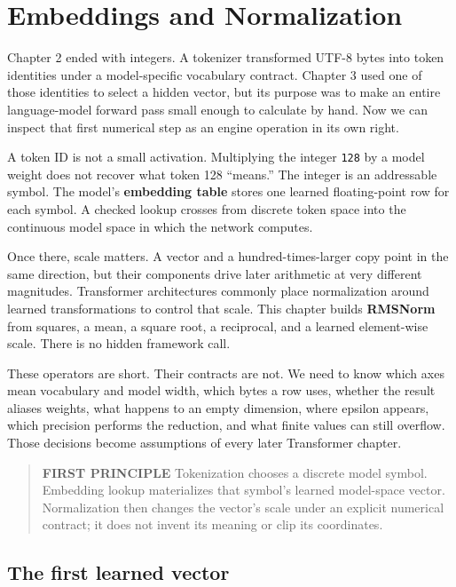 \chapter{Embeddings and Normalization}\label{chapter-7-embeddings-and-normalization}
Chapter 2 ended with integers. A tokenizer transformed UTF-8 bytes into
token identities under a model-specific vocabulary contract. Chapter 3
used one of those identities to select a hidden vector, but its purpose
was to make an entire language-model forward pass small enough to
calculate by hand. Now we can inspect that first numerical step as an
engine operation in its own right.

A token ID is not a small activation. Multiplying the integer
\texttt{128} by a model weight does not recover what token 128
``means.'' The integer is an addressable symbol. The model's
\textbf{embedding table} stores one learned floating-point row for each
symbol. A checked lookup crosses from discrete token space into the
continuous model space in which the network computes.

Once there, scale matters. A vector and a hundred-times-larger copy
point in the same direction, but their components drive later arithmetic
at very different magnitudes. Transformer architectures commonly place
normalization around learned transformations to control that scale. This
chapter builds \textbf{RMSNorm} from squares, a mean, a square root, a
reciprocal, and a learned element-wise scale. There is no hidden
framework call.

These operators are short. Their contracts are not. We need to know
which axes mean vocabulary and model width, which bytes a row uses,
whether the result aliases weights, what happens to an empty dimension,
where epsilon appears, which precision performs the reduction, and what
finite values can still overflow. Those decisions become assumptions of
every later Transformer chapter.

\begin{quote}
\textbf{FIRST PRINCIPLE} Tokenization chooses a discrete model symbol.
Embedding lookup materializes that symbol's learned model-space vector.
Normalization then changes the vector's scale under an explicit
numerical contract; it does not invent its meaning or clip its
coordinates.
\end{quote}

\section{The first learned vector}\label{the-first-learned-vector}

